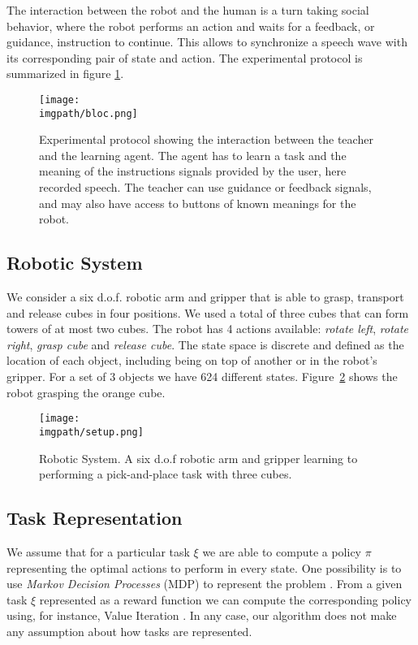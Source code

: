 The interaction between the robot and the human is a turn taking social behavior, where the robot performs an action and waits for a feedback, or guidance, instruction to continue. This allows to synchronize a speech wave with its corresponding pair of state and action. The experimental protocol is summarized in figure \ref{fig:lfui:bloc}.

\begin{figure}[!htbp]
  \centering
  \texttt{[image: \\imgpath/bloc.png]}
  \caption{Experimental protocol showing the interaction between the teacher and the learning agent. The agent has to learn a task and the meaning of the instructions signals provided by the user, here recorded speech. The teacher can use guidance or feedback signals, and may also have access to buttons of known meanings for the robot.}
  \label{fig:lfui:bloc}    
\end{figure}

\subsection{Robotic System}

We consider a six d.o.f. robotic arm and gripper that is able to grasp, transport and release cubes in four positions. We used a total of three cubes that can form towers of at most two cubes.  The robot has 4 actions available: \textit{rotate left}, \textit{rotate right}, \textit{grasp cube} and \textit{release cube}. The state space is discrete and defined as the location of each object, including being on top of another or in the robot's gripper. For a set of 3 objects we have 624 different states. Figure~\ref{fig:lfui:setup} shows the robot grasping the orange cube. 

\begin{figure}[!htbp]
  \centering
  \texttt{[image: \\imgpath/setup.png]}
  \caption{Robotic System. A six d.o.f robotic arm and gripper learning to performing a pick-and-place task with three cubes.}
  \label{fig:lfui:setup}
\end{figure}

\subsection{Task Representation}

We assume that for a particular task $\xi$ we are able to compute a policy $\pi$ representing the optimal actions to perform in every state. One possibility is to use \textit{Markov Decision Processes} (MDP) to represent the problem \cite{sutton1998reinforcement}. From a given task $\xi$ represented as a reward function we can compute the corresponding policy using, for instance, Value Iteration \cite{sutton1998reinforcement}. In any case, our algorithm does not make any assumption about how tasks are represented.

